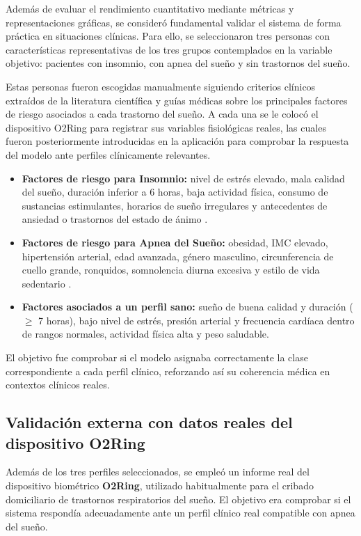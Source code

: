 Además de evaluar el rendimiento cuantitativo mediante métricas y representaciones gráficas, se consideró fundamental validar el sistema de forma práctica en situaciones clínicas. Para ello, se seleccionaron tres personas con características representativas de los tres grupos contemplados en la variable objetivo: pacientes con insomnio, con apnea del sueño y sin trastornos del sueño.

Estas personas fueron escogidas manualmente siguiendo criterios clínicos extraídos de la literatura científica y guías médicas sobre los principales factores de riesgo asociados a cada trastorno del sueño. A cada una se le colocó el dispositivo O2Ring para registrar sus variables fisiológicas reales, las cuales fueron posteriormente introducidas en la aplicación para comprobar la respuesta del modelo ante perfiles clínicamente relevantes.


\begin{itemize}
    \item \textbf{Factores de riesgo para Insomnio:} nivel de estrés elevado, mala calidad del sueño, duración inferior a 6 horas, baja actividad física, consumo de sustancias estimulantes, horarios de sueño irregulares y antecedentes de ansiedad o trastornos del estado de ánimo \cite{nhlbi_insomnio}.
    
    \item \textbf{Factores de riesgo para Apnea del Sueño:} obesidad, IMC elevado, hipertensión arterial, edad avanzada, género masculino, circunferencia de cuello grande, ronquidos, somnolencia diurna excesiva y estilo de vida sedentario \cite{mayoclinic_apnea}.

    \item \textbf{Factores asociados a un perfil sano:} sueño de buena calidad y duración ($\geq$ 7 horas), bajo nivel de estrés, presión arterial y frecuencia cardíaca dentro de rangos normales, actividad física alta y peso saludable.
\end{itemize}

El objetivo fue comprobar si el modelo asignaba correctamente la clase correspondiente a cada perfil clínico, reforzando así su coherencia médica en contextos clínicos reales.

\subsection{Validación externa con datos reales del dispositivo O2Ring}

Además de los tres perfiles seleccionados, se empleó un informe real del dispositivo biométrico \textbf{O2Ring}, utilizado habitualmente para el cribado domiciliario de trastornos respiratorios del sueño. El objetivo era comprobar si el sistema respondía adecuadamente ante un perfil clínico real compatible con apnea del sueño.

